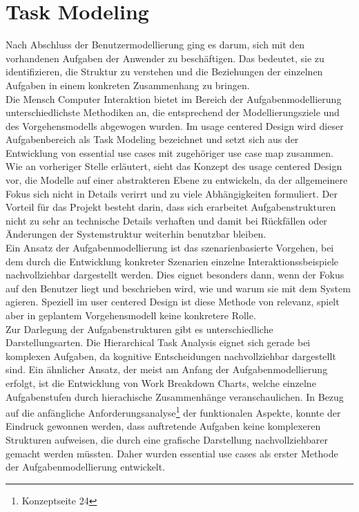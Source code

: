 
\section{Task Modeling}
Nach Abschluss der Benutzermodellierung ging es darum, sich mit den vorhandenen Aufgaben der Anwender zu beschäftigen. Das bedeutet, sie zu identifizieren, die Struktur zu verstehen und die Beziehungen der einzelnen Aufgaben in einem konkreten Zusammenhang zu bringen.\\

Die Mensch Computer Interaktion bietet im Bereich der Aufgabenmodellierung unterschiedlichste Methodiken an, die entsprechend der Modellierungsziele und des Vorgehensmodells abgewogen wurden. Im usage centered Design wird dieser Aufgabenbereich als Task Modeling bezeichnet und setzt sich aus der Entwicklung von essential use cases mit zugehöriger use case map zusammen.\\
Wie an vorheriger Stelle erläutert, sieht das Konzept des usage centered Design vor, die Modelle auf einer abstrakteren Ebene zu entwickeln, da der allgemeinere Fokus sich nicht in Details verirrt und zu viele Abhängigkeiten formuliert. Der Vorteil für das Projekt besteht darin, dass sich erarbeitet Aufgabenstrukturen nicht zu sehr an technische Details verhaften und damit bei Rückfällen oder Änderungen der Systemstruktur weiterhin benutzbar bleiben. \\
Ein Ansatz der Aufgabenmodellierung ist das szenarienbasierte Vorgehen, bei dem durch die Entwicklung konkreter Szenarien einzelne Interaktionssbeispiele nachvollziehbar dargestellt werden. Dies eignet besonders dann, wenn der Fokus auf den Benutzer liegt und beschrieben wird, wie und warum sie mit dem System agieren. Speziell im user centered Design ist diese Methode von relevanz, spielt aber in geplantem Vorgehensmodell keine konkretere Rolle.\\

Zur Darlegung der Aufgabenstrukturen gibt es unterschiedliche Darstellungsarten. Die Hierarchical Task Analysis eignet sich gerade bei komplexen Aufgaben, da kognitive Entscheidungen nachvollziehbar dargestellt sind. Ein ähnlicher Ansatz, der meist am Anfang der Aufgabenmodellierung erfolgt, ist die Entwicklung von Work Breakdown Charts, welche einzelne Aufgabenstufen durch hierachische Zusammenhänge veranschaulichen. In Bezug auf die anfängliche Anforderungsanalyse\footnote{Konzeptseite 24} der funktionalen Aspekte, konnte der Eindruck gewonnen werden, dass auftretende Aufgaben keine komplexeren Strukturen aufweisen, die durch eine grafische Darstellung nachvollziehbarer gemacht werden müssten. Daher wurden essential use cases als erster Methode der Aufgabenmodellierung entwickelt.

